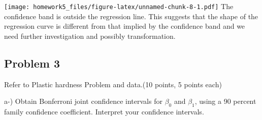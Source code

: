 \documentclass[
]{article}
\newenvironment{Shaded}{\begin{snugshade}}{\end{snugshade}}
\newcommand{\DataTypeTok}[1]{\textcolor[rgb]{0.13,0.29,0.53}{#1}}
\newcommand{\DecValTok}[1]{\textcolor[rgb]{0.00,0.00,0.81}{#1}}
\newcommand{\FloatTok}[1]{\textcolor[rgb]{0.00,0.00,0.81}{#1}}
\newcommand{\KeywordTok}[1]{\textcolor[rgb]{0.13,0.29,0.53}{\textbf{#1}}}
\newcommand{\NormalTok}[1]{#1}
\newcommand{\OperatorTok}[1]{\textcolor[rgb]{0.81,0.36,0.00}{\textbf{#1}}}
\newcommand{\StringTok}[1]{\textcolor[rgb]{0.31,0.60,0.02}{#1}}
\begin{document}
\begin{Shaded}
\end{Shaded}

\texttt{[image: homework5\_files/figure-latex/unnamed-chunk-8-1.pdf]} The
confidence band is outside the regression line. This suggests that the
shape of the regression curve is different from that implied by the
confidence band and we need further investigation and possibly
transformation.

\hypertarget{problem-3}{%
\subsection{Problem 3}\label{problem-3}}

Refer to Plastic hardness Problem and data.(10 points, 5 points each)

a-) Obtain Bonferroni joint confidence intervals for \(\beta_{0}\) and
\(\beta_{1}\), using a 90 percent family confidence coefficient.
Interpret your confidence intervals.
\end{document}
